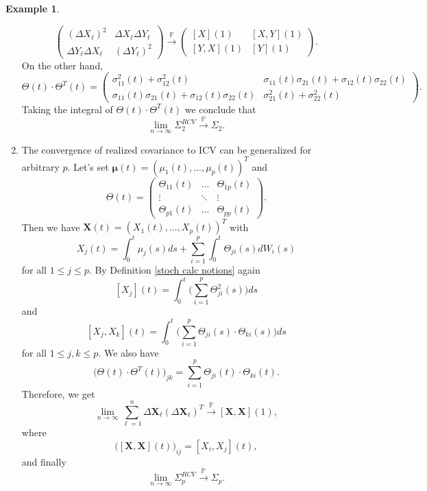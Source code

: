 \documentclass[a4paper,11pt]{article}
\theoremstyle{plain}
\theoremstyle{definition}
\newtheorem{exmp}[thm]{Example}
\begin{document}
\begin{exmp}
\begin{enumerate}
\[\begin{pmatrix}
			(\Delta X_\ell)^2 & \Delta X_\ell \Delta Y_\ell \\
			\Delta Y_\ell \Delta X_\ell & (\Delta Y_\ell)^2
			\end{pmatrix} 
			\xrightarrow{\mathbb{P}} 
			\begin{pmatrix}
			[X](1) & [X, Y](1) \\
			[Y, X](1) & [Y](1)
		    \end{pmatrix}.
			\]
			On the other hand,
			\[ \Theta(t) \cdot \Theta^T(t) = \begin{pmatrix}
			\sigma_{11}^2(t) + \sigma_{12}^2(t) & \sigma_{11}(t)\sigma_{21}(t) + \sigma_{12}(t)\sigma_{22}(t) \\
			\sigma_{11}(t)\sigma_{21}(t) + \sigma_{12}(t)\sigma_{22}(t)  & \sigma_{21}^2(t) + \sigma_{22}^2(t)
			\end{pmatrix}. \]
			Taking the integral of $\Theta(t) \cdot \Theta^T(t)$ we conclude that
			\[ \lim_{n \rightarrow \infty} \Sigma_2^{RCV} \xrightarrow{\mathbb{P}} \Sigma_2. \]
			\item 
			The convergence of realized covariance to ICV can be generalized for arbitrary $p$. Let's set $\boldsymbol{\mu}(t) = (\mu_1(t), \dots, \mu_p(t))^T$ and
			\[ 
			\Theta(t) = \begin{pmatrix}
			\Theta_{11}(t) & \dots & \Theta_{1p}(t) \\
			\vdots & \ddots & \vdots \\
			\Theta_{p1}(t) & \dots & \Theta_{pp}(t)
			\end{pmatrix}.
			\]
			Then we have $\mathbf{X}(t) = (X_1(t), \dots, X_p(t))^T$ with
			\[X_j(t) =  \int_0^t\mu_j(s) ds +  \sum_{i=1}^{p} \int_0^t \Theta_{ji}(s) dW_i(s) \]			
			for all $1 \leq j \leq p$. By Definition \ref{stoch calc notions} again
			\[ [X_j](t)= \int_0^t \bigg( \sum_{i=1}^{p} \Theta_{ji}^2(s) \bigg) ds \]
			and
			\[ [X_j, X_k](t) = \int_0^t \bigg(  \sum_{i=1}^{p} \Theta_{ji}(s) \cdot \Theta_{ki}(s) \bigg) ds \]
			for all $1 \leq j,k \leq p$.
			We also have
			\[ 
			\Big(\Theta(t) \cdot \Theta^T(t) \Big)_{jk}   = \sum_{i=1}^{p} \Theta_{ji}(t) \cdot \Theta_{ki}(t).
			\]
			Therefore, we get
			\[  \lim_{n \rightarrow \infty} \sum_{\ell=1}^{n}\Delta \mathbf{X}_\ell(\Delta \mathbf{X}_\ell)^T \xrightarrow{\mathbb{P}} [\mathbf{X}, \mathbf{X}](1), \]
			where 
			\[ \Big( [\mathbf{X}, \mathbf{X}](t)\Big)_{ij} = [X_i, X_j](t), \]
			and finally
			\[ \lim_{n \rightarrow \infty} \Sigma_p^{RCV} \xrightarrow{\mathbb{P}} \Sigma_p. \]
		\end{enumerate}
		

\end{exmp}
\end{document}
